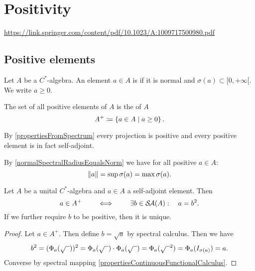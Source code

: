 \section{Positivity}
\url{https://link.springer.com/content/pdf/10.1023/A:1009717500980.pdf}
\subsection{Positive elements}
\begin{definition}
Let $A$ be a $C^*$-algebra. An element $a\in A$ is  if it is normal and $\sigma(a) \subset [0,+\infty[$. We write $a\geq 0$.

The set of all positive elements of $A$ is the  of $A$
\[ A^+ \coloneqq \left\{ a\in A \;\middle|\; a\geq 0 \right\}. \]
\end{definition}
By \ref{propertiesFromSpectrum} every projection is positive and every positive element is in fact self-adjoint.

By \ref{normalSpectralRadiusEqualsNorm} we have for all positive $a\in A$:
\[ \lVert a\rVert = \sup\sigma(a) = \max\sigma(a). \]

\begin{proposition}
Let $A$ be a unital $C^*$-algebra and $a\in A$ a self-adjoint element. Then
\[ a\in A^+ \qquad\iff\qquad \exists b\in \mathop{\mathcal{S}\hspace{-0.15em}\mathcal{A}}\nolimits(A):\quad a = b^2. \]
If we further require $b$ to be positive, then it is unique.
\end{proposition}
\begin{proof}
Let $a\in A^+$. Then define $b = \sqrt{a}$ by spectral calculus. Then we have
\[ b^2 = (\Phi_a(\sqrt{\mbox{\;\;}}))^2 = \Phi_a(\sqrt{\mbox{\;\;}})\cdot \Phi_a(\sqrt{\mbox{\;\;}}) = \Phi_a(\sqrt{\mbox{\;\;}}^2) = \Phi_a(I_{\sigma(a)}) = a. \]
Converse by spectral mapping \ref{propertiesContinuousFunctionalCalculus}.
\end{proof}

